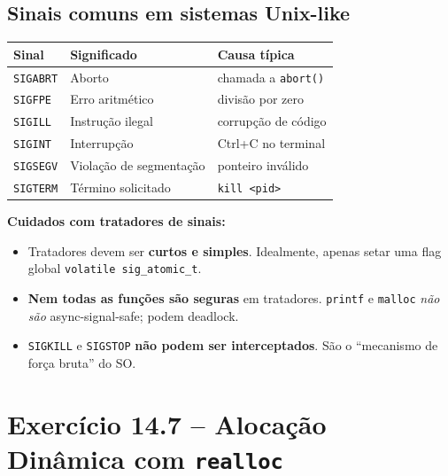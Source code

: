 \documentclass[12pt,a4paper]{article}
\begin{document}
\subsection*{Sinais comuns em sistemas Unix-like}

\begin{respostabox}
\begin{center}
\renewcommand{\arraystretch}{1.25}
\begin{tabular}{l l l}
\toprule
\textbf{Sinal} & \textbf{Significado} & \textbf{Causa típica} \\ \midrule
\texttt{SIGABRT} & Aborto                & chamada a \texttt{abort()} \\
\texttt{SIGFPE}  & Erro aritmético        & divisão por zero \\
\texttt{SIGILL}  & Instrução ilegal       & corrupção de código \\
\texttt{SIGINT}  & Interrupção            & Ctrl+C no terminal \\
\texttt{SIGSEGV} & Violação de segmentação& ponteiro inválido \\
\texttt{SIGTERM} & Término solicitado     & \texttt{kill <pid>} \\
\bottomrule
\end{tabular}
\end{center}

\begin{atencao}
\textbf{Cuidados com tratadores de sinais:}
\begin{itemize}[noitemsep]
  \item Tratadores devem ser \textbf{curtos e simples}. Idealmente, apenas
  setar uma flag global \texttt{volatile sig\_atomic\_t}.
  \item \textbf{Nem todas as funções são seguras} em tratadores. \texttt{printf}
  e \texttt{malloc} \textit{não são} async-signal-safe; podem deadlock.
  \item \texttt{SIGKILL} e \texttt{SIGSTOP} \textbf{não podem ser interceptados}.
  São o ``mecanismo de força bruta'' do SO.
\end{itemize}
\end{atencao}
\end{respostabox}

\newpage

\section{Exercício 14.7 -- Alocação Dinâmica com \texttt{realloc}}
\end{document}

